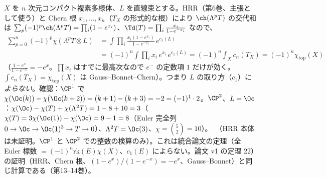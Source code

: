 \begin{rem}\label{rem:chiLambdaT}
$X$ を $n$ 次元コンパクト複素多様体、$L$ を直線束とする。HRR（第6巻、主張として使う）と Chern 根 $x_1,\dots,x_n$（$T_X$ の形式的な根）により $\ch(\Lambda^pT)$ の交代和は $\sum_p(-1)^p\ch(\Lambda^pT)=\prod_i(1-e^{x_i})$、$\Td(T)=\prod_i\frac{x_i}{1-e^{-x_i}}$ なので、
\[
\begin{aligned}\sum_{p=0}^n(-1)^p\chi(\Lambda^pT\otimes L)&=\int\prod_i\frac{x_i(1-e^{x_i})}{1-e^{-x_i}}\,e^{c_1(L)}\\&=(-1)^n\int\prod_ix_i\,e^{x_i}\,e^{c_1(L)}=(-1)^n\int_Xc_n(T_X)=(-1)^n\chi_{\mathrm{top}}(X)\end{aligned}
\]
（$\frac{1-e^x}{1-e^{-x}}=-e^x$。$\prod x_i$ はすでに最高次なので $e^{\cdots}$ の定数項 $1$ だけが効く。$\int c_n(T_X)=\chi_{\mathrm{top}}(X)$ は Gauss--Bonnet--Chern）。つまり $L$ の取り方（$c_1$）に\emph{よらない}。確認：$\CP^1$ で $\chi(\Oc(k))-\chi(\Oc(k+2))=(k+1)-(k+3)=-2=(-1)^1\cdot2$。$\CP^2$、$L=\Oc$：$\chi(\Oc)-\chi(T)+\chi(\Lambda^2T)=1-8+10=3$（$\chi(T)=3\chi(\Oc(1))-\chi(\Oc)=9-1=8$（Euler 完全列 $0\to\Oc\to\Oc(1)^{3}\to T\to0$）、$\Lambda^2T=\Oc(3)$、$\chi=\binom52=10$）。\tQ\ （HRR 本体は未証明。$\CP^1$ と $\CP^2$ での整数の検算のみ）。これは統合論文の定理（全 Euler 標数 $=(-1)^n\mathrm{rk}(E)\chi(X)$、$c_1(E)$ によらない。論文 v1 の定理 22）の証明（HRR、Chern 根、$(1-e^x)/(1-e^{-x})=-e^x$、Gauss--Bonnet）と同じ計算である（第13--14巻）。
\end{rem}

